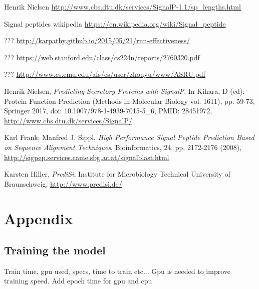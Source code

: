 \newpage

\begin{thebibliography}{9}

 Henrik Nielsen
\url{http://www.cbs.dtu.dk/services/SignalP-1.1/sp_lengths.html}

 Signal peptides wikipedia
\url{https://en.wikipedia.org/wiki/Signal_peptide}

 ???
\url{http://karpathy.github.io/2015/05/21/rnn-effectiveness/}

 ???
\url{https://web.stanford.edu/class/cs224n/reports/2760320.pdf}

 ???
\url{http://www.cs.cmu.edu/afs/cs/user/zhouyu/www/ASRU.pdf}

 Henrik Nielsen,
 {\em Predicting Secretory Proteins with SignalP},
 In Kihara, D (ed): Protein Function Prediction (Methods in Molecular Biology vol. 1611),  pp. 59-73, Springer 2017, doi: 10.1007/978-1-4939-7015-5\_6, PMID: 28451972, 
\url{http://www.cbs.dtu.dk/services/SignalP/}  %

 Karl Frank; Manfred J. Sippl,
{\em High Performance Signal Peptide Prediction Based on Sequence Alignment Techniques},
Bioinformatics, 24, pp. 2172-2176 (2008), \url{http://sigpep.services.came.sbg.ac.at/signalblast.html}

  Karsten Hiller,
{\em PrediSi}, Institute for Microbiology Technical University of Braunschweig, 
\url{http://www.predisi.de/}

\end{thebibliography}


\newpage

\section{Appendix}

\subsection{Training the model}
Train time, gpu used, specs, time to train etc...
Gpu is needed to improve training speed. Add epoch time for gpu and cpu

